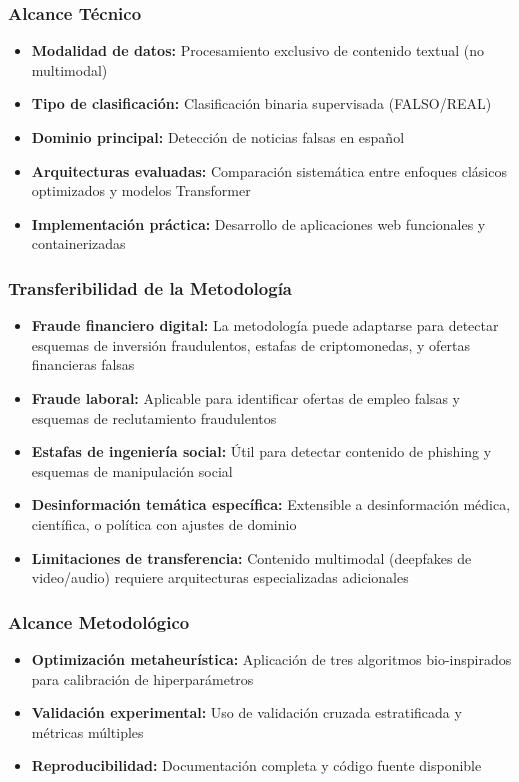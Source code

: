 \subsubsection{Alcance Técnico}
\begin{itemize}
    \item \textbf{Modalidad de datos:} Procesamiento exclusivo de contenido textual (no multimodal)
    \item \textbf{Tipo de clasificación:} Clasificación binaria supervisada (FALSO/REAL)
    \item \textbf{Dominio principal:} Detección de noticias falsas en español
    \item \textbf{Arquitecturas evaluadas:} Comparación sistemática entre enfoques clásicos optimizados y modelos Transformer
    \item \textbf{Implementación práctica:} Desarrollo de aplicaciones web funcionales y containerizadas
\end{itemize}

\subsubsection{Transferibilidad de la Metodología}
\begin{itemize}
    \item \textbf{Fraude financiero digital:} La metodología puede adaptarse para detectar esquemas de inversión fraudulentos, estafas de criptomonedas, y ofertas financieras falsas
    \item \textbf{Fraude laboral:} Aplicable para identificar ofertas de empleo falsas y esquemas de reclutamiento fraudulentos
    \item \textbf{Estafas de ingeniería social:} Útil para detectar contenido de phishing y esquemas de manipulación social
    \item \textbf{Desinformación temática específica:} Extensible a desinformación médica, científica, o política con ajustes de dominio
    \item \textbf{Limitaciones de transferencia:} Contenido multimodal (deepfakes de video/audio) requiere arquitecturas especializadas adicionales
\end{itemize}

\subsubsection{Alcance Metodológico}
\begin{itemize}
    \item \textbf{Optimización metaheurística:} Aplicación de tres algoritmos bio-inspirados para calibración de hiperparámetros
    \item \textbf{Validación experimental:} Uso de validación cruzada estratificada y métricas múltiples
    \item \textbf{Reproducibilidad:} Documentación completa y código fuente disponible
\end{itemize}

